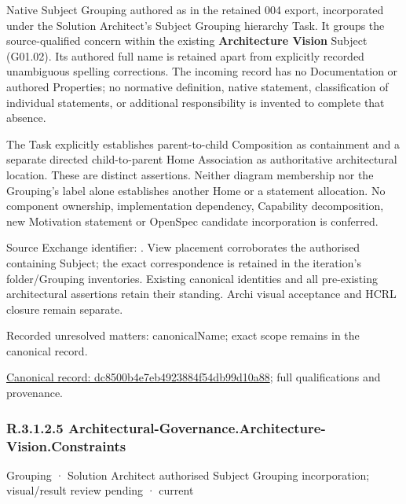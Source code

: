 Native Subject Grouping authored as \texttt{} in the retained 004 export,
incorporated under the Solution Architect's Subject Grouping hierarchy Task.
It groups the source-qualified \texttt{} concern within
the existing \textbf{Architecture Vision} Subject (G01.02). Its authored full name
is retained apart from explicitly recorded unambiguous spelling corrections.
The incoming record has no Documentation or authored Properties; no normative
definition, native statement, classification of individual statements, or
additional responsibility is invented to complete that absence.



The Task explicitly establishes parent-to-child Composition as containment and
a separate directed child-to-parent Home Association as authoritative architectural
location. These are distinct assertions. Neither diagram membership nor the
Grouping's label alone establishes another Home or a statement allocation.
No component ownership, implementation dependency, Capability decomposition,
new Motivation statement or OpenSpec candidate incorporation is conferred.



Source Exchange identifier: \texttt{}. View placement corroborates
the authorised containing Subject; the exact correspondence is retained in the
iteration's folder/Grouping inventories. Existing canonical identities and all
pre-existing architectural assertions retain their standing. Archi visual
acceptance and HCRL closure remain separate.


{\small Recorded unresolved matters: canonicalName; exact scope remains in the canonical record.}\par
{\footnotesize \href{../../../../continuum/grouping/dc8500b4e7eb4923884f54db99d10a88.md}{Canonical record: dc8500b4e7eb4923884f54db99d10a88}; full qualifications and provenance.}\par
\subsubsection*{R.3.1.2.5 Architectural-Governance.Architecture-Vision.Constraints}
\label{navigation:R.3.1.2.5}

\label{element:54d5ba1ccaae46c8b372f7ccfca99741}
{\small Grouping · Solution Architect authorised Subject Grouping incorporation; visual/result review pending · current}\par


